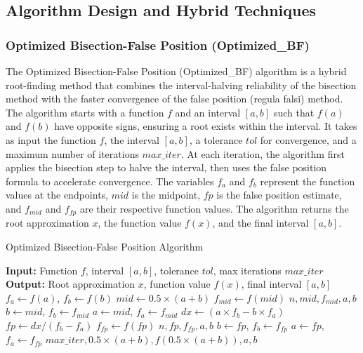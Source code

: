 \documentclass[reprint, amsmath, amssymb, aps, prl]{revtex4-2}
\begin{document}
\subsection{Algorithm Design and Hybrid Techniques}

\subsubsection{Optimized Bisection-False Position (Optimized\_BF)}

The Optimized Bisection-False Position (Optimized\_BF) algorithm is a hybrid root-finding method that combines the interval-halving reliability of the bisection method with the faster convergence of the false position (regula falsi) method. The algorithm starts with a function $f$ and an interval $[a, b]$ such that $f(a)$ and $f(b)$ have opposite signs, ensuring a root exists within the interval. It takes as input the function $f$, the interval $[a, b]$, a tolerance $tol$ for convergence, and a maximum number of iterations $max\_iter$. At each iteration, the algorithm first applies the bisection step to halve the interval, then uses the false position formula to accelerate convergence. The variables $f_a$ and $f_b$ represent the function values at the endpoints, $mid$ is the midpoint, $fp$ is the false position estimate, and $f_{mid}$ and $f_{fp}$ are their respective function values. The algorithm returns the root approximation $x$, the function value $f(x)$, and the final interval $[a, b]$.

\vspace{1em}
\begin{algorithm}[h!]
\caption{Optimized Bisection-False Position Algorithm}
\begin{algorithmic}[1]
\State \textbf{Input:} Function $f$, interval $[a, b]$, tolerance $tol$, max iterations $max\_iter$
\State \textbf{Output:} Root approximation $x$, function value $f(x)$, final interval $[a, b]$
\State $f_a \gets f(a)$, $f_b \gets f(b)$
    \State $mid \gets 0.5 \times (a + b)$
    \State $f_{mid} \gets f(mid)$
        \State \Return $n, mid, f_{mid}, a, b$
    \EndIf
        \State $b \gets mid$, $f_b \gets f_{mid}$
    \Else
        \State $a \gets mid$, $f_a \gets f_{mid}$
    \EndIf
    \State $dx \gets (a \times f_b - b \times f_a)$
    \State $fp \gets dx / (f_b - f_a)$
    \State $f_{fp} \gets f(fp)$
        \State \Return $n, fp, f_{fp}, a, b$
    \EndIf
        \State $b \gets fp$, $f_b \gets f_{fp}$
    \Else
        \State $a \gets fp$, $f_a \gets f_{fp}$
    \EndIf
\EndFor
\State \Return $max\_iter, 0.5 \times (a + b), f(0.5 \times (a + b)), a, b$
\end{algorithmic}
\end{algorithm}
\vspace{1em}
\end{document}
